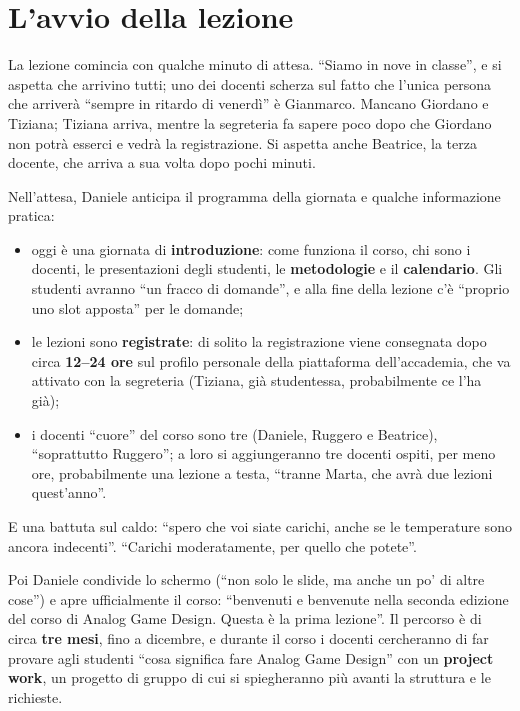 \section{L'avvio della lezione}
\label{a1:sec:avvio}

La lezione comincia con qualche minuto di attesa. ``Siamo in nove in classe'', e
si aspetta che arrivino tutti; uno dei docenti scherza sul fatto che l'unica
persona che arriverà ``sempre in ritardo di venerdì'' è Gianmarco. Mancano
Giordano e Tiziana; Tiziana arriva, mentre la segreteria fa sapere poco dopo che
Giordano non potrà esserci e vedrà la registrazione. Si aspetta anche Beatrice,
la terza docente, che arriva a sua volta dopo pochi minuti.

Nell'attesa, Daniele anticipa il programma della giornata e qualche
informazione pratica:
\begin{itemize}
  \item oggi è una giornata di \textbf{introduzione}: come funziona il corso, chi
        sono i docenti, le presentazioni degli studenti, le \textbf{metodologie}
        e il \textbf{calendario}. Gli studenti avranno ``un fracco di domande'', e
        alla fine della lezione c'è ``proprio uno slot apposta'' per le domande;
  \item le lezioni sono \textbf{registrate}: di solito la registrazione viene
        consegnata dopo circa \textbf{12--24 ore} sul profilo personale della
        piattaforma dell'accademia, che va attivato con la segreteria (Tiziana,
        già studentessa, probabilmente ce l'ha già);
  \item i docenti ``cuore'' del corso sono tre (Daniele, Ruggero e Beatrice),
        ``soprattutto Ruggero''; a loro si aggiungeranno tre docenti ospiti, per
        meno ore, probabilmente una lezione a testa, ``tranne Marta, che avrà due
        lezioni quest'anno''.
\end{itemize}
E una battuta sul caldo: ``spero che voi siate carichi, anche se le temperature
sono ancora indecenti''. ``Carichi moderatamente, per quello che potete''.

Poi Daniele condivide lo schermo (``non solo le slide, ma anche un po' di altre
cose'') e apre ufficialmente il corso: ``benvenuti e benvenute nella seconda
edizione del corso di Analog Game Design. Questa è la prima lezione''. Il
percorso è di circa \textbf{tre mesi}, fino a dicembre, e durante il corso i
docenti cercheranno di far provare agli studenti ``cosa significa fare Analog
Game Design'' con un \textbf{project work}, un progetto di gruppo di cui si
spiegheranno più avanti la struttura e le richieste.

